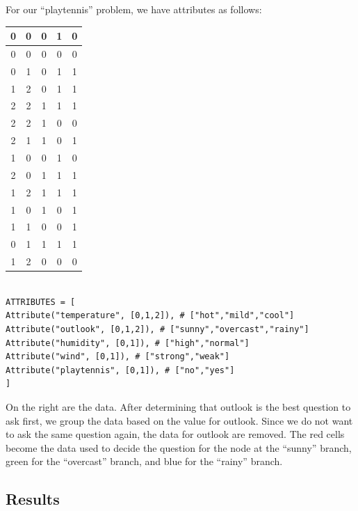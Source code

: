\documentclass[11pt,a4paper]{article}
\begin{document}
For our ``playtennis'' problem, we have attributes as follows:

{
\begin{table}
\begin{tabular}{| c | c | c | c | c |}
\hline
\rowcolor[RGB]{255, 150, 150}
0 & \cellcolor{white}0 & 0 & 1 & 0 \\ \hline 
\rowcolor[RGB]{255, 150, 150}
0 & \cellcolor{white}0 & 0 & 0 & 0 \\ \hline 
\rowcolor[RGB]{150, 255, 150}
0 & \cellcolor{white}1 & 0 & 1 & 1 \\ \hline 
\rowcolor[RGB]{150, 150, 255}
1 & \cellcolor{white}2 & 0 & 1 & 1 \\ \hline 
\rowcolor[RGB]{150, 150, 255}
2 & \cellcolor{white}2 & 1 & 1 & 1 \\ \hline 
\rowcolor[RGB]{150, 150, 255}
2 & \cellcolor{white}2 & 1 & 0 & 0 \\ \hline
\rowcolor[RGB]{150, 255, 150}
2 & \cellcolor{white}1 & 1 & 0 & 1 \\ \hline 
\rowcolor[RGB]{255, 150, 150}
1 & \cellcolor{white}0 & 0 & 1 & 0 \\ \hline 
\rowcolor[RGB]{255, 150, 150}
2 & \cellcolor{white}0 & 1 & 1 & 1 \\ \hline 
\rowcolor[RGB]{150, 150, 255}
1 & \cellcolor{white}2 & 1 & 1 & 1 \\ \hline 
\rowcolor[RGB]{255, 150, 150}
1 & \cellcolor{white}0 & 1 & 0 & 1 \\ \hline 
\rowcolor[RGB]{150, 255, 150}
1 & \cellcolor{white}1 & 0 & 0 & 1 \\ \hline 
\rowcolor[RGB]{150, 255, 150}
0 & \cellcolor{white}1 & 1 & 1 & 1 \\ \hline 
\rowcolor[RGB]{150, 150, 255}
1 & \cellcolor{white}2 & 0 & 0 & 0 \\ \hline 
\end{tabular}
\end{table}

\begin{lstlisting}

ATTRIBUTES = [
Attribute("temperature", [0,1,2]), # ["hot","mild","cool"]
Attribute("outlook", [0,1,2]), # ["sunny","overcast","rainy"]
Attribute("humidity", [0,1]), # ["high","normal"]
Attribute("wind", [0,1]), # ["strong","weak"]
Attribute("playtennis", [0,1]), # ["no","yes"]
]
\end{lstlisting}

On the right are the data. After determining that outlook is the best question to ask first, we group the data based on the value for outlook. Since we do not want to ask the same question again, the data for outlook are removed. The red cells become the data used to decide the question for the node at the ``sunny'' branch, green for the ``overcast'' branch, and blue for the ``rainy'' branch.

\newpage
\subsection{Results}
\label{DecisionTrees:Results}
}
\end{document}
